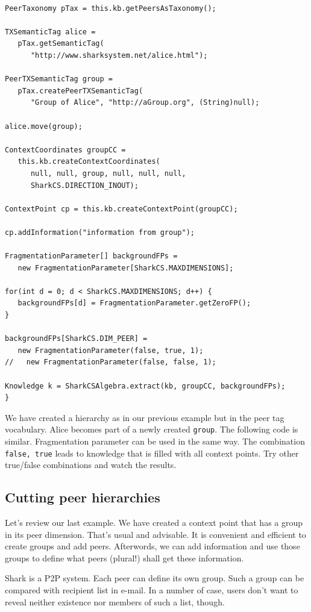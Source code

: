 \begin{verbatim}

PeerTaxonomy pTax = this.kb.getPeersAsTaxonomy();

TXSemanticTag alice = 
   pTax.getSemanticTag(
      "http://www.sharksystem.net/alice.html");

PeerTXSemanticTag group = 
   pTax.createPeerTXSemanticTag(
      "Group of Alice", "http://aGroup.org", (String)null);

alice.move(group);

ContextCoordinates groupCC = 
   this.kb.createContextCoordinates(
      null, null, group, null, null, null, 
      SharkCS.DIRECTION_INOUT);

ContextPoint cp = this.kb.createContextPoint(groupCC);

cp.addInformation("information from group");

FragmentationParameter[] backgroundFPs =
   new FragmentationParameter[SharkCS.MAXDIMENSIONS];

for(int d = 0; d < SharkCS.MAXDIMENSIONS; d++) {
   backgroundFPs[d] = FragmentationParameter.getZeroFP();
}

backgroundFPs[SharkCS.DIM_PEER] = 
   new FragmentationParameter(false, true, 1);
//   new FragmentationParameter(false, false, 1);

Knowledge k = SharkCSAlgebra.extract(kb, groupCC, backgroundFPs);
}
\end{verbatim}

We have created a hierarchy as in our previous example but in the peer tag vocabulary.
Alice becomes part of a newly created {\tt group}. The following code is similar. Fragmentation parameter can be used in the same way. The combination 
{\tt false, true} leads to knowledge that is filled with all context points. Try other true/false combinations and watch the results.

\subsection{Cutting peer hierarchies}
Let's review our last example. We have created a context point that has a group in its peer dimension. That's usual and advisable. It is convenient and efficient to create groups and add peers. Afterwords, we can add information and use those groups to define what peers (plural!) shall get these information.

Shark is a P2P system. Each peer can define its own group. Such a group can be compared with recipient list in e-mail. In a number of case, users don't want to reveal neither existence nor members of such a list, though.

